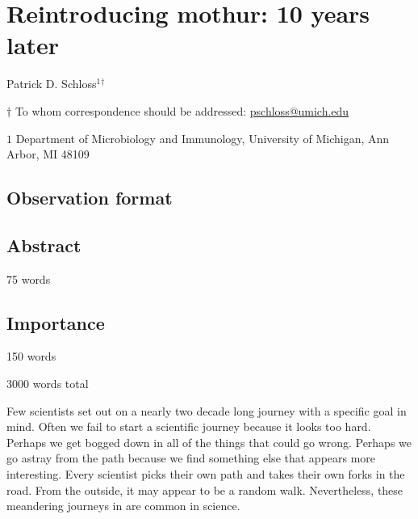 \documentclass[11pt,]{article}
\title{}
\author{}
\date{}
\begin{document}
\vspace*{10mm}

\hypertarget{reintroducing-mothur-10-years-later}{%
\section{Reintroducing mothur: 10 years
later}\label{reintroducing-mothur-10-years-later}}

\vspace{35mm}

Patrick D. Schloss\({^1}\)\({^\dagger}\)

\vspace{40mm}

\(\dagger\) To whom correspondence should be addressed:
\href{mailto:pschloss@umich.edu}{pschloss@umich.edu}

\(1\) Department of Microbiology and Immunology, University of Michigan,
Ann Arbor, MI 48109

\vspace{35mm}

\hypertarget{observation-format}{%
\subsection{Observation format}\label{observation-format}}

\newpage
\linenumbers

\hypertarget{abstract}{%
\subsection{Abstract}\label{abstract}}

75 words

\newpage

\hypertarget{importance}{%
\subsection{Importance}\label{importance}}

150 words

\newpage

3000 words total

Few scientists set out on a nearly two decade long journey with a
specific goal in mind. Often we fail to start a scientific journey
because it looks too hard. Perhaps we get bogged down in all of the
things that could go wrong. Perhaps we go astray from the path because
we find something else that appears more interesting. Every scientist
picks their own path and takes their own forks in the road. From the
outside, it may appear to be a random walk. Nevertheless, these
meandering journeys in are common in science.
\end{document}
